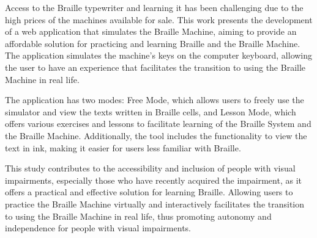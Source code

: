 \begin{abstractotherlanguage}

Access to the Braille typewriter and learning it has been challenging due to the high prices of the machines available for sale. This work presents the development of a web application that simulates the Braille Machine, aiming to provide an affordable solution for practicing and learning Braille and the Braille Machine. The application simulates the machine's keys on the computer keyboard, allowing the user to have an experience that facilitates the transition to using the Braille Machine in real life.

The application has two modes: Free Mode, which allows users to freely use the simulator and view the texts written in Braille cells, and Lesson Mode, which offers various exercises and lessons to facilitate learning of the Braille System and the Braille Machine. Additionally, the tool includes the functionality to view the text in ink, making it easier for users less familiar with Braille.

This study contributes to the accessibility and inclusion of people with visual impairments, especially those who have recently acquired the impairment, as it offers a practical and effective solution for learning Braille. Allowing users to practice the Braille Machine virtually and interactively facilitates the transition to using the Braille Machine in real life, thus promoting autonomy and independence for people with visual impairments.


\end{abstractotherlanguage}





